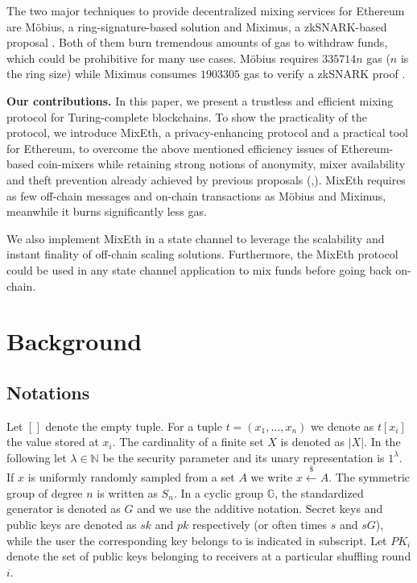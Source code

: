 \documentclass[a4paper]{article}
\theoremstyle{definition}
\begin{document}
The two major techniques to provide decentralized mixing services for Ethereum are Möbius, a ring-signature-based solution \cite{meiklejohn2018mobius} and Miximus, a zkSNARK-based proposal \cite{miximus2018}. Both of them burn tremendous amounts of gas to withdraw funds, which could be prohibitive for many use cases. Möbius requires $\num[group-separator={,}]{335714}n$ gas ($n$ is the ring size) while Miximus consumes $\num[group-separator={,}]{1903305}$ gas to verify a zkSNARK proof \cite{miximus2018gascost}.

\textbf{Our contributions.} In this paper, we present a trustless and efficient mixing protocol for Turing-complete blockchains. To show the practicality of the protocol, we introduce MixEth, a privacy-enhancing protocol and a practical tool for Ethereum, to overcome the above mentioned efficiency issues of Ethereum-based coin-mixers while retaining strong notions of anonymity, mixer availability and theft prevention already achieved by previous proposals (\cite{meiklejohn2018mobius},\cite{miximus2018}). MixEth requires as few off-chain messages and on-chain transactions as Möbius and Miximus, meanwhile it burns significantly less gas.

We also implement MixEth in a state channel to leverage the scalability and instant finality of off-chain scaling solutions. Furthermore, the MixEth protocol could be used in any state channel application to mix funds before going back on-chain. 


\section{Background}
\subsection{Notations}
Let $[]$ denote the empty tuple. For a tuple $t=(x_1,\dots,x_n)$ we denote as $t[x_i]$ the value stored at $x_{i}$. The cardinality of a finite set $X$ is denoted as $|X|$. In the following let $\lambda \in \mathbb{N}$ be the security parameter and its unary representation is $1^{\lambda}$. If $x$ is uniformly randomly sampled from a set $A$ we write $x\stackrel{\$}{\leftarrow}A$. The symmetric group of degree $n$ is written as ${S}_n$. In a cyclic group $\mathbb{G}$, the standardized generator is denoted as $G$ and we use the additive notation. Secret keys and public keys are denoted as $sk$ and $pk$ respectively (or often times $s$ and $sG$), while the user the corresponding key belongs to is indicated in subscript. Let $PK_{i}$ denote the set of public keys belonging to receivers at a particular shuffling round $i$.
\end{document}
